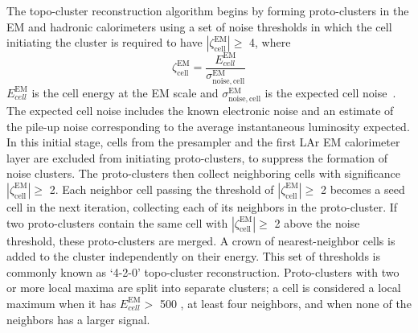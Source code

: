 The topo-cluster reconstruction algorithm begins by forming proto-clusters in the EM and hadronic calorimeters using a set of noise thresholds in which the cell initiating the cluster is required to have $|\zeta_{\mathrm{cell}}^{\mathrm{EM}}|\geq$ 4, where
\begin{equation}
    \zeta_{\mathrm{cell}}^{\mathrm{EM}}= \frac{E_{cell}^{\mathrm{EM}}}{\sigma_{\mathrm{noise,cell}}^{\mathrm{EM}}}
\end{equation}
$E_{cell}^{\mathrm{EM}}$ is the cell energy at the EM scale and $\sigma_{\mathrm{noise,cell}}^{\mathrm{EM}}$ is the expected cell noise~\cite{EGAM-2018-01}.
The expected cell noise includes the known electronic noise and an estimate of the pile-up noise corresponding to the average instantaneous luminosity expected.
In this initial stage, cells from the presampler and the first LAr EM calorimeter layer are excluded from initiating proto-clusters, to suppress the formation of noise clusters.
The proto-clusters then collect neighboring cells with significance $|\zeta_{\mathrm{cell}}^{\mathrm{EM}}|\geq$ 2.
Each neighbor cell passing the threshold of $|\zeta_{\mathrm{cell}}^{\mathrm{EM}}|\geq$ 2 becomes a seed cell in the next iteration, collecting each of its neighbors in the proto-cluster.
If two proto-clusters contain the same cell with $|\zeta_{\mathrm{cell}}^{\mathrm{EM}}|\geq$ 2 above the noise threshold, these proto-clusters are merged.
A crown of nearest-neighbor cells is added to the cluster independently on their energy.
This set of thresholds is commonly known as ‘4-2-0’ topo-cluster reconstruction.
Proto-clusters with two or more local maxima are split into separate clusters; a cell is considered a local maximum when it has $E_{cell}^{\mathrm{EM}}>$ 500 \MeV, at least four neighbors, and when none of the neighbors has a larger signal.